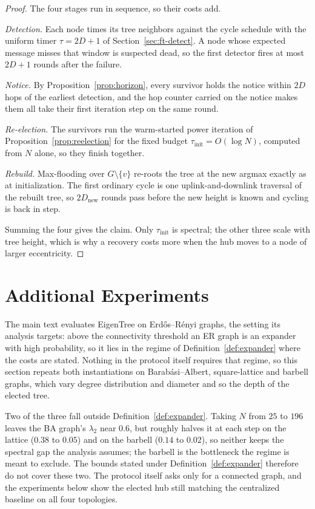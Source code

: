 \documentclass[letterpaper]{article} %
\begin{document}
\begin{proof}
The four stages run in sequence, so their costs add.

\emph{Detection.} Each node times its tree neighbors against the cycle
schedule with the uniform timer $\tau = 2D+1$ of Section~\ref{sec:ft-detect}.
A node whose expected message misses that window is suspected dead, so the
first detector fires at most $2D+1$ rounds after the failure.

\emph{Notice.} By Proposition~\ref{prop:horizon}, every survivor holds the
notice within $2D$ hops of the earliest detection, and the hop counter carried
on the notice makes them all take their first iteration step on the same round.

\emph{Re-election.} The survivors run the warm-started power iteration of
Proposition~\ref{prop:reelection} for the fixed budget $\tau_{\mathrm{init}} =
O(\log N)$, computed from $N$ alone, so they finish together.

\emph{Rebuild.} Max-flooding over $G\setminus\{v\}$ re-roots the tree at the
new argmax exactly as at initialization. The first ordinary cycle is one
uplink-and-downlink traversal of the rebuilt tree, so $2D_{\mathrm{new}}$
rounds pass before the new height is known and cycling is back in step.

Summing the four gives the claim. Only $\tau_{\mathrm{init}}$ is spectral;
the other three scale with tree height, which is why a recovery costs more
when the hub moves to a node of larger eccentricity.
\end{proof}

\section{Additional Experiments}
\label{sec:exp}

The main text evaluates EigenTree on Erd\H{o}s--R\'{e}nyi graphs, the setting
its analysis targets: above the connectivity threshold an ER graph is an
expander with high probability, so it lies in the regime of
Definition~\ref{def:expander} where the costs are stated. Nothing in the
protocol itself requires that regime, so this section repeats both
instantiations on Barab\'{a}si--Albert, square-lattice and barbell graphs,
which vary degree distribution and diameter and so the depth of the elected
tree.

Two of the three fall outside Definition~\ref{def:expander}. Taking $N$ from
$25$ to $196$ leaves the BA graph's $\lambda_2$ near $0.6$, but roughly halves
it at each step on the lattice ($0.38$ to $0.05$) and on the barbell ($0.14$
to $0.02$), so neither keeps the spectral gap the analysis assumes; the
barbell is the bottleneck the regime is meant to exclude. The bounds stated
under Definition~\ref{def:expander} therefore do not cover these two. The
protocol itself asks only for a connected graph, and the experiments below
show the elected hub still matching the centralized baseline on all four
topologies. 
\end{document}
